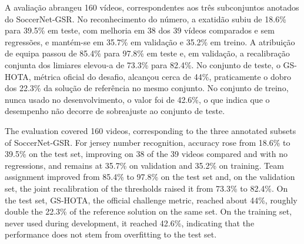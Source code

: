 


A avaliação abrangeu 160 vídeos, correspondentes aos três subconjuntos anotados do
SoccerNet-GSR. No reconhecimento do número, a exatidão subiu de 18.6\% para 39.5\% em
teste, com melhoria em 38 dos 39 vídeos comparados e sem regressões, e mantém-se em
35.7\% em validação e 35.2\% em treino. A atribuição de equipa passou de 85.4\% para
97.8\% em teste e, em validação, a recalibração conjunta dos limiares elevou-a de 73.3\%
para 82.4\%. No conjunto de teste, o GS-HOTA, métrica oficial do desafio, alcançou cerca
de 44\%, praticamente o dobro dos 22.3\% da solução de referência no mesmo conjunto. No
conjunto de treino, nunca usado no desenvolvimento, o valor foi de 42.6\%, o que indica
que o desempenho não decorre de sobreajuste ao conjunto de teste.



The evaluation covered 160 videos, corresponding to the three annotated subsets of
SoccerNet-GSR. For jersey number recognition, accuracy rose from 18.6\% to 39.5\% on the
test set, improving on 38 of the 39 videos compared and with no regressions, and remains
at 35.7\% on validation and 35.2\% on training. Team assignment improved from 85.4\% to
97.8\% on the test set and, on the validation set, the joint recalibration of the
thresholds raised it from 73.3\% to 82.4\%. On the test set, GS-HOTA, the official
challenge metric, reached about 44\%, roughly double the 22.3\% of the reference solution
on the same set. On the training set, never used during development, it reached 42.6\%,
indicating that the performance does not stem from overfitting to the test set.



